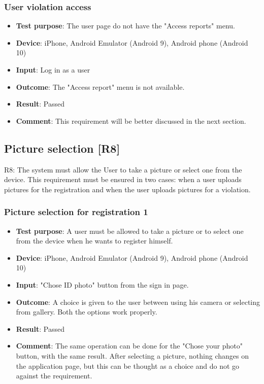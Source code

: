 \documentclass[../ATD.tex]{subfiles}
\begin{document}
    \subsubsection{User violation access}\label{subsubsec:user-violation-access}
    \begin{itemize}
        \item \textbf{Test purpose}: The user page do not have the "Access reports" menu.
        \item \textbf{Device}: iPhone, Android Emulator (Android 9), Android phone (Android 10)
        \item \textbf{Input}: Log in as a user
        \item \textbf{Outcome}: The "Access report" menu is not available.
        \item \textbf{Result}: Passed
        \item \textbf{Comment}: This requirement will be better discussed in the next section.
    \end{itemize}

    \subsection{Picture selection [R8]}\label{subsec:picture-selection}
    R8: The system must allow the User to take a picture or select one from the device.
    This requirement must be ensured in two cases: when a user uploads pictures for the registration and when the user uploads pictures for a violation.

    \subsubsection{Picture selection for registration 1}\label{subsubsec:picture-selection-for-registration-1}
    \begin{itemize}
        \item \textbf{Test purpose}: A user must be allowed to take a picture or to select one from the device when he wants to register himself.
        \item \textbf{Device}: iPhone, Android Emulator (Android 9), Android phone (Android 10)
        \item \textbf{Input}: "Chose ID photo" button from the sign in page.
        \item \textbf{Outcome}: A choice is given to the user between using his camera or selecting from gallery.
        Both the options work properly.
        \item \textbf{Result}: Passed
        \item \textbf{Comment}: The same operation can be done for the "Chose your photo" button, with the same result.
        After selecting a picture, nothing changes on the application page, but this can be thought as a choice and do not go against the requirement.
    \end{itemize}
\end{document}
